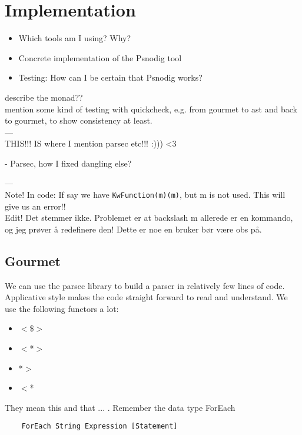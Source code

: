 \chapter{Implementation}
\begin{itemize}
    \item Which tools am I using? Why?
    \item Concrete implementation of the Psnodig tool
    \item Testing: How can I be certain that Psnodig works?
\end{itemize}

describe the monad?? \\

mention some kind of testing with quickcheck, e.g. from gourmet to ast and back to gourmet, to show consistency at least. \\

--- \\

THIS!!! IS where I mention parsec etc!!! :))) <3

- Parsec, how I fixed dangling else?


--- \\

Note! In code: If say we have \texttt{KwFunction(m)(m)}, but m is not used. This will give us an error!! \\

Edit! Det stemmer ikke. Problemet er at backslash m allerede er en kommando, og jeg prøver å redefinere den! Dette er noe en bruker bør være obs på.

\section{Gourmet}

We can use the parsec library to build a parser in relatively few lines of code. Applicative style makes the code straight forward to read and understand. We use the following functors a lot:

\begin{itemize}
    \item $<$\$$>$
    \item $<$*$>$
    \item *$>$
    \item $<$*
\end{itemize}

They mean this and that ... . Remember the data type ForEach

\begin{lstlisting}
    ForEach String Expression [Statement]
\end{lstlisting}

